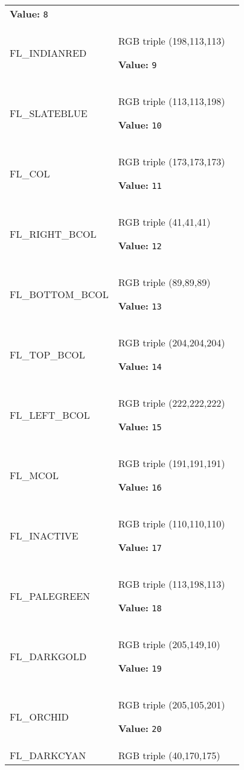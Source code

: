 \begin{longtable}{|p{\varnamewidth}|p{\vardescrwidth}|l}
\textbf{Value:} 
{\tt 8}&\\
\cline{1-2}
\raggedright F\-L\-\_\-I\-N\-D\-I\-A\-N\-R\-E\-D\- & \raggedright RGB triple (198,113,113)

\textbf{Value:} 
{\tt 9}&\\
\cline{1-2}
\raggedright F\-L\-\_\-S\-L\-A\-T\-E\-B\-L\-U\-E\- & \raggedright RGB triple (113,113,198)

\textbf{Value:} 
{\tt 10}&\\
\cline{1-2}
\raggedright F\-L\-\_\-C\-O\-L\-1\- & \raggedright RGB triple (173,173,173)

\textbf{Value:} 
{\tt 11}&\\
\cline{1-2}
\raggedright F\-L\-\_\-R\-I\-G\-H\-T\-\_\-B\-C\-O\-L\- & \raggedright RGB triple (41,41,41)

\textbf{Value:} 
{\tt 12}&\\
\cline{1-2}
\raggedright F\-L\-\_\-B\-O\-T\-T\-O\-M\-\_\-B\-C\-O\-L\- & \raggedright RGB triple (89,89,89)

\textbf{Value:} 
{\tt 13}&\\
\cline{1-2}
\raggedright F\-L\-\_\-T\-O\-P\-\_\-B\-C\-O\-L\- & \raggedright RGB triple (204,204,204)

\textbf{Value:} 
{\tt 14}&\\
\cline{1-2}
\raggedright F\-L\-\_\-L\-E\-F\-T\-\_\-B\-C\-O\-L\- & \raggedright RGB triple (222,222,222)

\textbf{Value:} 
{\tt 15}&\\
\cline{1-2}
\raggedright F\-L\-\_\-M\-C\-O\-L\- & \raggedright RGB triple (191,191,191)

\textbf{Value:} 
{\tt 16}&\\
\cline{1-2}
\raggedright F\-L\-\_\-I\-N\-A\-C\-T\-I\-V\-E\- & \raggedright RGB triple (110,110,110)

\textbf{Value:} 
{\tt 17}&\\
\cline{1-2}
\raggedright F\-L\-\_\-P\-A\-L\-E\-G\-R\-E\-E\-N\- & \raggedright RGB triple (113,198,113)

\textbf{Value:} 
{\tt 18}&\\
\cline{1-2}
\raggedright F\-L\-\_\-D\-A\-R\-K\-G\-O\-L\-D\- & \raggedright RGB triple (205,149,10)

\textbf{Value:} 
{\tt 19}&\\
\cline{1-2}
\raggedright F\-L\-\_\-O\-R\-C\-H\-I\-D\- & \raggedright RGB triple (205,105,201)

\textbf{Value:} 
{\tt 20}&\\
\cline{1-2}
\raggedright F\-L\-\_\-D\-A\-R\-K\-C\-Y\-A\-N\- & \raggedright RGB triple (40,170,175)


\end{longtable}
